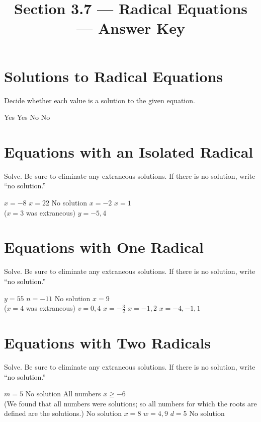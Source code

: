 

\title{Section 3.7 --- Radical Equations --- Answer Key}


\maketitle

\section*{Solutions to Radical Equations}
Decide whether each value is a solution to the given equation.
\begin{smenum}
\mitemxxxx
{Yes}
{Yes}
{No}
{No}
\end{smenum}

\section*{Equations with an Isolated Radical}
Solve.  Be sure to eliminate any extraneous solutions. If there is no solution, write ``no solution.''
\begin{smenum}
\mitemxxx
{$x=-8$}
{$x=22$}
{No solution}
\mitemxxx
{$x=-2$}
{$x=1$\\($x=3$ was extraneous)}
{$y=-5,4$}
\end{smenum}

\section*{Equations with One Radical}
Solve.  Be sure to eliminate any extraneous solutions. If there is no solution, write ``no solution.''
\begin{smenum}
\mitemxxx
{$y=55$}
{$n=-11$}
{No solution}
\mitemxxx
{$x=9$\\($x=4$ was extraneous)}
{$v=0,4$}
{$x=-\frac{3}{2}$}
\mitemxx
{$x=-1,2$}
{$x=-4,-1,1$}
\end{smenum}

\section*{Equations with Two Radicals}
Solve.  Be sure to eliminate any extraneous solutions. If there is no solution, write ``no solution.''
\begin{smenum}
\mitemxx
{$m=5$}
{No solution}
\mitemxx
{All numbers $x\geq -6$\\(We found that all numbers were solutions; so all numbers for which the roots are defined are the solutions.)}
{No solution}
\mitemxx
{$x=8$}
{$w=4,9$}
\mitemxx
{$d=5$}
{No solution}
\end{smenum}


